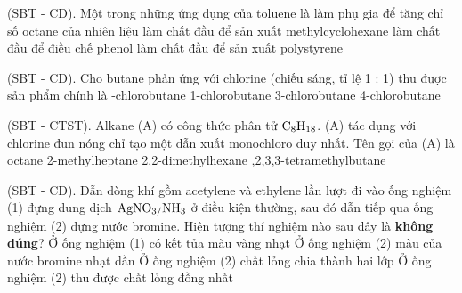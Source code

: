 \documentclass[12pt,a4paper]{article}
\begin{document}
\begin{ex}
(SBT - CD). Một trong những ứng dụng của toluene là
\choice
{\True làm phụ gia để tăng chỉ số octane của nhiên liệu}
{làm chất đầu để sản xuất methylcyclohexane}
{làm chất đầu để điều chế phenol}
{làm chất đầu để sản xuất polystyrene}
\end{ex}

\begin{ex}
(SBT - CD). Cho butane phản ứng với chlorine (chiếu sáng, tỉ lệ 1 : 1) thu được sản phẩm chính là
\choice
{-chlorobutane}
{1-chlorobutane}
{3-chlorobutane}
{4-chlorobutane}
\end{ex}

\begin{ex}
(SBT - CTST). Alkane (A) có công thức phân tử $\ce{C8H18}$. (A) tác dụng với chlorine đun nóng chỉ tạo một dẫn xuất monochloro duy nhất. Tên gọi của (A) là
\choice
{octane}
{2-methylheptane}
{2,2-dimethylhexane}
{,2,3,3-tetramethylbutane}
\end{ex}

\begin{ex}
(SBT - CD). Dẫn dòng khí gồm acetylene và ethylene lần lượt đi vào ống nghiệm (1) đựng dung dịch $\ce{AgNO3/NH3}$ ở điều kiện thường, sau đó dẫn tiếp qua ống nghiệm (2) đựng nước bromine. Hiện tượng thí nghiệm nào sau đây là \textbf{không đúng}?
\choice
{Ở ống nghiệm (1) có kết tủa màu vàng nhạt}
{Ở ống nghiệm (2) màu của nước bromine nhạt dần}
{Ở ống nghiệm (2) chất lỏng chia thành hai lớp}
{\True Ở ống nghiệm (2) thu được chất lỏng đồng nhất}
\end{ex}
\end{document}

